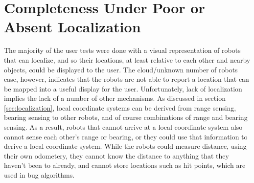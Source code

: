 %
%
%
%
%

\section{Completeness Under Poor or Absent Localization}

The majority of the user tests were done with a visual representation of robots that can localize, and so their locations, at least relative to each other and nearby objects, could be displayed to the user. 
The cloud/unknown number of robots case, however, indicates that the robots are not able to report a location that can be mapped into a useful display for the user. 
Unfortunately, lack of localization implies the lack of a number of other mechanisms. 
As discussed in section \ref{sec:localization}, local coordinate systems can be derived from range sensing, bearing sensing to other robots, and of course combinations of range and bearing sensing. 
As a result, robots that cannot arrive at a local coordinate system also cannot sense each other's range or bearing, or they could use that information to derive a local coordinate system. 
While the robots could measure distance, using their own odometery, they cannot know the distance to anything that they haven't been to already, and cannot store locations such as hit points, which are used in bug algorithms. 

